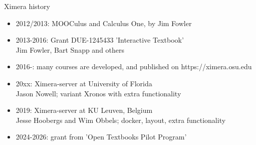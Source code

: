 \begin{frame}{Ximera history}
  \begin{itemize}[<+->]
    \item 2012/2013: MOOCulus and Calculus One, by Jim Fowler
    \item 2013-2016: Grant DUE-1245433  'Interactive Textbook' \\  Jim Fowler, Bart Snapp and others
    \item 2016-: many courses are developed, and published on https://ximera.osu.edu
    \item 20xx: Ximera-server at University of Florida \\ Jason Nowell; variant Xronos with extra functionality
    \item 2019: Ximera-server at KU Leuven, Belgium \\ Jesse Hoobergs and Wim Obbels; docker, layout, extra functionality
    \item 2024-2026: grant from 'Open Textbooks Pilot Program'
  \end{itemize}

\end{frame}


